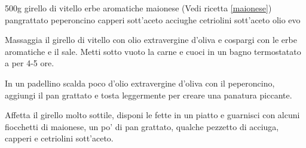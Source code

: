 \begin{ingreds}
	500g girello di vitello 
	erbe aromatiche
	maionese (Vedi ricetta \ref{maionese}) 
	pangrattato 
	peperoncino 
	capperi sott'aceto 
	acciughe 
	cetriolini sott'aceto 
	olio evo 
\end{ingreds}

\begin{method}
Massaggia il girello di vitello con olio extravergine d'oliva e cospargi con le erbe aromatiche e il sale. Metti sotto vuoto la carne e cuoci in un bagno termostatato a  per 4-5 ore.

In un padellino scalda poco d'olio extravergine d'oliva con il peperoncino, aggiungi il pan grattato e tosta leggermente per creare una panatura piccante.

Affetta il girello molto sottile, disponi le fette in un piatto e guarnisci con alcuni fiocchetti di maionese, un po' di pan grattato, qualche pezzetto di acciuga, capperi e cetriolini sott'aceto.
\end{method}
